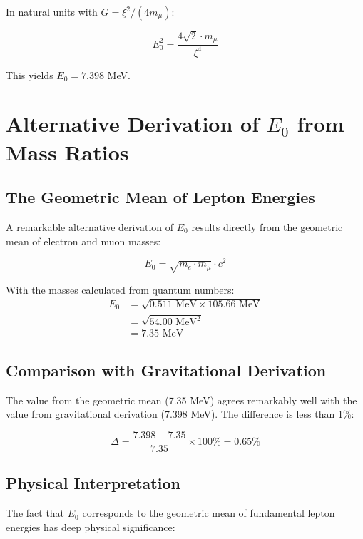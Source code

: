 \documentclass[12pt,a4paper]{article}
\begin{document}
	In natural units with $G = \xi^2/(4m_\mu)$:
	
	\begin{equation}
		E_0^2 = \frac{4\sqrt{2} \cdot m_\mu}{\xi^4}
	\end{equation}
	
	This yields $E_0 = 7.398$ MeV.
	
	\section{Alternative Derivation of $E_0$ from Mass Ratios}
	
	\subsection{The Geometric Mean of Lepton Energies}
	
	A remarkable alternative derivation of $E_0$ results directly from the geometric mean of electron and muon masses:
	
	\begin{equation}
		E_0 = \sqrt{m_e \cdot m_\mu} \cdot c^2
	\end{equation}
	
	With the masses calculated from quantum numbers:
	\begin{align}
		E_0 &= \sqrt{0.511 \text{ MeV} \times 105.66 \text{ MeV}}\\
		&= \sqrt{54.00 \text{ MeV}^2}\\
		&= 7.35 \text{ MeV}
	\end{align}
	
	\subsection{Comparison with Gravitational Derivation}
	
	The value from the geometric mean (7.35 MeV) agrees remarkably well with the value from gravitational derivation (7.398 MeV). The difference is less than 1\%:
	
	\begin{equation}
		\Delta = \frac{7.398 - 7.35}{7.35} \times 100\% = 0.65\%
	\end{equation}
	
	\subsection{Physical Interpretation}
	
	The fact that $E_0$ corresponds to the geometric mean of fundamental lepton energies has deep physical significance:
	
\end{document}
